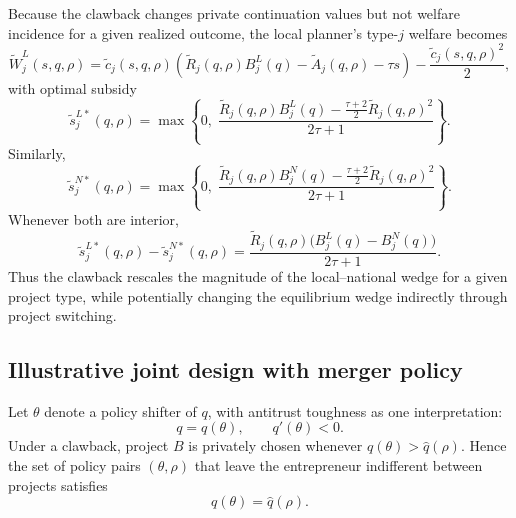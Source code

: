 Because the clawback changes private continuation values but not welfare incidence for a given realized outcome, the local planner's type-\(j\) welfare becomes
\begin{equation}\label{eq:WtildeL}
    \widetilde W_j^L(s,q,\rho)
    =
    \widetilde c_j(s,q,\rho)
    \left(
        \widetilde R_j(q,\rho)B_j^L(q)
        -
        \widetilde A_j(q,\rho)
        -
        \tau s
    \right)
    -
    \frac{\widetilde c_j(s,q,\rho)^2}{2},
\end{equation}
with optimal subsidy
\begin{equation}\label{eq:stildeclaw}
    \widetilde s_j^{L*}(q,\rho)
    =
    \max\left\{
        0,\;
        \frac{
            \widetilde R_j(q,\rho)B_j^L(q)
            -
            \frac{\tau+2}{2}\widetilde R_j(q,\rho)^2
        }{2\tau+1}
    \right\}.
\end{equation}
Similarly,
\begin{equation}\label{eq:stildeclawn}
    \widetilde s_j^{N*}(q,\rho)
    =
    \max\left\{
        0,\;
        \frac{
            \widetilde R_j(q,\rho)B_j^N(q)
            -
            \frac{\tau+2}{2}\widetilde R_j(q,\rho)^2
        }{2\tau+1}
    \right\}.
\end{equation}
Whenever both are interior,
\begin{equation}\label{eq:wedgeclawback}
    \widetilde s_j^{L*}(q,\rho)-\widetilde s_j^{N*}(q,\rho)
    =
    \frac{
        \widetilde R_j(q,\rho)\bigl(B_j^L(q)-B_j^N(q)\bigr)
    }{2\tau+1}.
\end{equation}
Thus the clawback rescales the magnitude of the local--national wedge for a given project type, while potentially changing the equilibrium wedge indirectly through project switching.

\subsection{Illustrative joint design with merger policy}

Let \(\theta\) denote a policy shifter of \(q\), with antitrust toughness as one interpretation:
\begin{equation}
    q=q(\theta),
    \qquad
    q'(\theta)<0.
\end{equation}
Under a clawback, project \(B\) is privately chosen whenever \(q(\theta)>\hat q(\rho)\). Hence the set of policy pairs \((\theta,\rho)\) that leave the entrepreneur indifferent between projects satisfies
\begin{equation}\label{eq:implementationlocus}
    q(\theta)=\hat q(\rho).
\end{equation}

